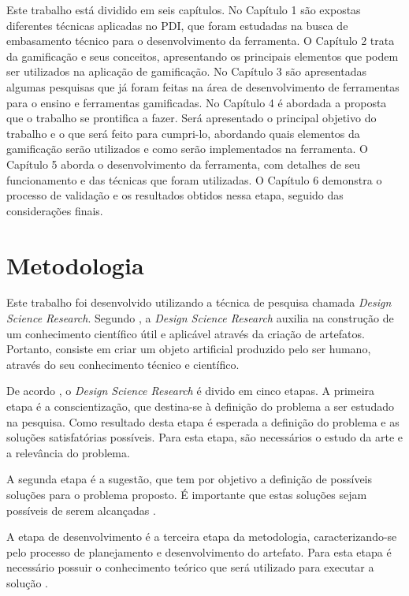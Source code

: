 \documentclass[
	12pt,				%
	oneside,			%
	a4paper,			%
	english,			%
	french,				%
	spanish,			%
	brazil,				%
	]{abntex2}
\begin{document}
Este trabalho está dividido em seis capítulos. No Capítulo 1 são expostas diferentes técnicas aplicadas no PDI, que foram estudadas na busca de embasamento técnico para o desenvolvimento da ferramenta. O Capítulo 2 trata da gamificação e seus conceitos, apresentando os principais elementos que podem ser utilizados na aplicação de gamificação. No Capítulo 3 são apresentadas algumas pesquisas que já foram feitas na área de desenvolvimento de ferramentas para o ensino e ferramentas gamificadas. No Capítulo 4 é abordada a proposta que o trabalho se prontifica a fazer. Será apresentado o principal objetivo do trabalho e o que será feito para cumpri-lo, abordando quais elementos da gamificação serão utilizados e como serão implementados na ferramenta. O Capítulo 5 aborda o desenvolvimento da ferramenta, com detalhes de seu funcionamento e das técnicas que foram utilizadas. O Capítulo 6 demonstra o processo de validação e os resultados obtidos nessa etapa, seguido das considerações finais.

\chapter{Metodologia}

Este trabalho foi desenvolvido utilizando a técnica de pesquisa chamada \textit{Design Science Research}. Segundo \citet{dresch:2015}, a \textit{Design
Science Research} auxilia na construção de um conhecimento científico útil e aplicável através da criação de artefatos. Portanto, consiste em criar um objeto artificial produzido pelo ser humano, através do seu conhecimento técnico e científico.

De acordo \citet{dresch:2015}, o \textit{Design
Science Research} é divido em cinco etapas. A primeira etapa é a conscientização, que destina-se à definição do problema a ser estudado na pesquisa. Como resultado desta etapa é esperada a definição do problema e as soluções satisfatórias possíveis. Para esta etapa, são necessários o estudo da arte e a relevância do problema.

A segunda etapa é a sugestão, que tem por objetivo a definição de possíveis soluções para o problema proposto. É importante que estas soluções sejam possíveis de serem alcançadas \cite{dresch:2015}.

A etapa de desenvolvimento é a terceira etapa da metodologia, caracterizando-se pelo processo de planejamento e desenvolvimento do artefato. Para esta etapa é necessário possuir o conhecimento teórico que será utilizado para executar a solução \cite{dresch:2015}.
\end{document}
